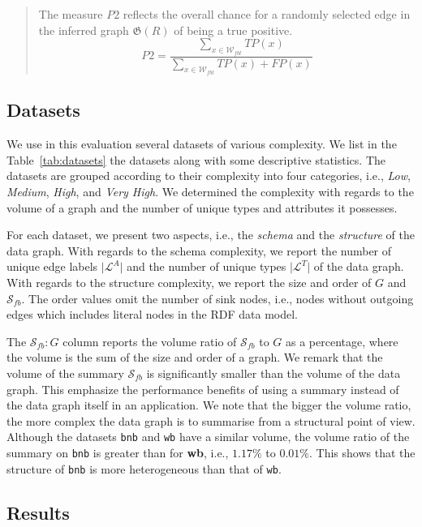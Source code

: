\begin{quotation}
The measure $P2$ reflects the overall chance for a randomly selected edge in the inferred graph $\mathfrak{G}(R)$ of being a true positive.
$$
P2 = \frac{\sum_{x \in \mathcal{W}_{fbt}}{TP(x)}}{\sum_{x \in \mathcal{W}_{fbt}}{TP(x) + FP(x)}}
$$
\end{quotation}

\subsection{Datasets}
\label{sec:eval:datasets}

We use in this evaluation several datasets of various complexity. We list in the Table~\ref{tab:datasets} the datasets along with some descriptive statistics. The datasets are grouped according to their complexity into four categories, i.e., \emph{Low}, \emph{Medium}, \emph{High}, and \emph{Very High}. We determined the complexity with regards to the volume of a graph and the number of unique types and attributes it possesses.

For each dataset, we present two aspects, i.e., the \emph{schema} and the \emph{structure} of the data graph. With regards to the schema complexity, we report the number of unique edge labels $\vert \mathcal{L}^A \vert$ and the number of unique types $\vert \mathcal{L}^T \vert$ of the data graph. With regards to the structure complexity, we report the size and order of $G$ and  $\mathcal{S}_{fb}$. The order values omit the number of sink nodes, i.e., nodes without outgoing edges which includes literal nodes in the RDF data model.

The $\mathcal{S}_{fb}:G$ column reports the volume ratio of $\mathcal{S}_{fb}$ to $G$ as a percentage, where the volume is the sum of the size and order of a graph. We remark that the volume of the summary $\mathcal{S}_{fb}$ is significantly smaller than the volume of the data graph. This emphasize the performance benefits of using a summary instead of the data graph itself in an application. We note that the bigger the volume ratio, the more complex the data graph is to summarise from a structural point of view. Although the datasets \texttt{bnb} and \texttt{wb} have a similar volume, the volume ratio of the summary on \texttt{bnb} is greater than for \textbf{wb}, i.e., $1.17\%$ to $0.01\%$. This shows that the structure of \texttt{bnb} is more heterogeneous than that of \texttt{wb}.



\subsection{Results}
\label{sec:eval:results}

